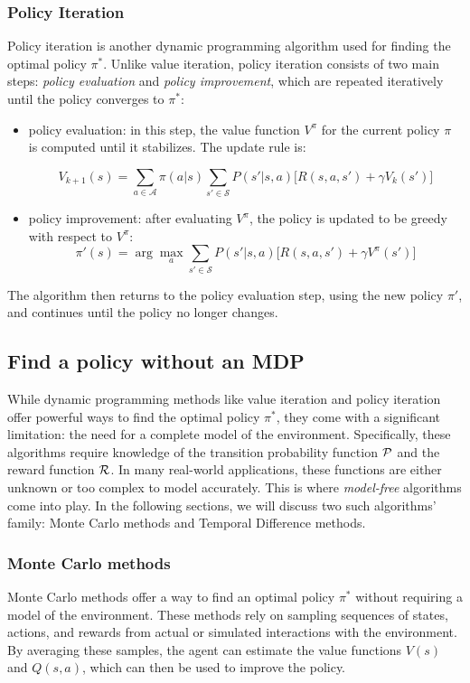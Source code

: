 \subsubsection{Policy Iteration}
Policy iteration is another dynamic programming algorithm used for finding the optimal policy \(\pi^*\). 
 Unlike value iteration, policy iteration consists of two main steps: 
 \emph{policy evaluation} and \emph{policy improvement}, 
 which are repeated iteratively until the policy converges to \(\pi^*\):
\begin{itemize}
  \item policy evaluation: in this step, the value function \(V^\pi\) for the current policy \(\pi\) is computed until it stabilizes. The update rule is:

  \begin{equation}
  V_{k+1}(s) = \sum_{a \in \mathcal{A}} \pi(a|s) \sum_{s' \in \mathcal{S}} P(s'|s, a) \Big[ R(s, a, s') + \gamma V_k(s') \Big]
  \end{equation}
  \item policy improvement: after evaluating \(V^\pi\), the policy is updated to be greedy with respect to \(V^\pi\):
  \begin{equation}
  \pi'(s) = \arg \max_{a} \sum_{s' \in \mathcal{S}} P(s'|s, a) \Big[ R(s, a, s') + \gamma V^\pi(s') \Big]
  \end{equation}
\end{itemize}
The algorithm then returns to the policy evaluation step, using the new policy \(\pi'\), and continues until the policy no longer changes.

\subsection{Find a policy without an MDP}
While dynamic programming methods like value iteration and policy iteration offer powerful ways to find the optimal policy \(\pi^*\), 
 they come with a significant limitation: 
 the need for a complete model of the environment. 
 Specifically, these algorithms require knowledge of the transition probability function \(\mathcal{P}\) and the reward function \(\mathcal{R}\). 
 In many real-world applications, these functions are either unknown or too complex to model accurately. 
 This is where \emph{model-free} algorithms come into play.
 In the following sections, we will discuss two such algorithms' family: 
 Monte Carlo methods and Temporal Difference methods.
\subsubsection{Monte Carlo methods}
Monte Carlo methods offer a way to find an optimal policy \(\pi^*\) without requiring a model of the environment. 
 These methods rely on sampling sequences of states, actions, and rewards from actual or simulated interactions with the environment. 
 By averaging these samples, the agent can estimate the value functions \(V(s)\) and \(Q(s, a)\), which can then be used to improve the policy.

